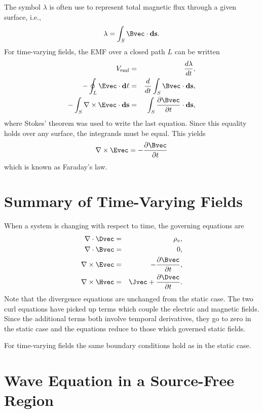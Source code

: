 The symbol $\lambda$ is often use to represent total magnetic flux
through a given surface, i.e.,
\begin{equation}
  \lambda = \int_S \Bvec\cdot\mathbf{ds}.
\end{equation}
For time-varying fields, the EMF over a closed path $L$ can be written
\begin{eqnarray}
  V_{\mbox{\scriptsize emf}} &=& \frac{d\lambda}{dt}, \\
  -\oint_L \Evec\cdot\mathbf{d\ell} &=& 
    \frac{d}{dt}\int_S \Bvec\cdot\mathbf{ds}, \\
  -\int_S \nabla\times\Evec\cdot\mathbf{ds} &=& 
    \int_S \frac{\partial\Bvec}{\partial t}\cdot\mathbf{ds},
\end{eqnarray}
where Stokes' theorem was used to write the last equation.  Since this
equality holds over any surface, the integrands must be equal.  This
yields
\begin{equation}
  \nabla\times\Evec = -\frac{\partial\Bvec}{\partial t}
\end{equation}
which is known as Faraday's law.

\section{Summary of Time-Varying Fields}

When a system is changing with respect to time, the governing
equations are
\begin{eqnarray}
\nabla \cdot \Dvec &=& \rho_v, \label{eq:divDtime} \\
\nabla \cdot \Bvec &=& 0, \\
\nabla \times \Evec &=& -\frac{\partial\Bvec}{\partial t}, 
  \label{eq:curlBtime} \\
\nabla \times \Hvec &=& \Jvec + \frac{\partial\Dvec}{\partial t}.
  \label{eq:curlHtime}
\end{eqnarray}
Note that the divergence equations are unchanged from the static
case.  The two curl equations have picked up terms which couple the
electric and magnetic fields.  Since the additional terms both
involve temporal derivatives, they go to zero in the static case and
the equations reduce to those which governed static fields.

For time-varying fields the same boundary conditions hold as in the
static case.

\section{Wave Equation in a Source-Free Region}

